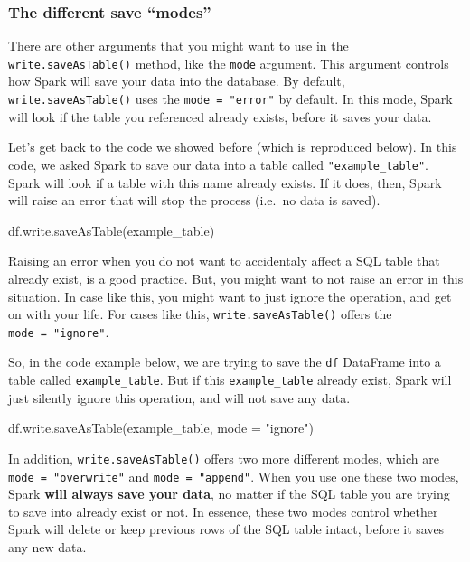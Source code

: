 \documentclass[
  11pt,
  letterpaper,
  DIV=11,
  numbers=noendperiod]{scrreprt}
\newenvironment{Shaded}{\begin{snugshade}}{\end{snugshade}}
\newcommand{\NormalTok}[1]{\textcolor[rgb]{0.00,0.23,0.31}{#1}}
\newcommand{\OperatorTok}[1]{\textcolor[rgb]{0.37,0.37,0.37}{#1}}
\newcommand{\StringTok}[1]{\textcolor[rgb]{0.13,0.47,0.30}{#1}}
\begin{document}
\subsubsection{The different save ``modes''}\label{sec-sql-save-modes}

There are other arguments that you might want to use in the
\texttt{write.saveAsTable()} method, like the \texttt{mode} argument.
This argument controls how Spark will save your data into the database.
By default, \texttt{write.saveAsTable()} uses the
\texttt{mode\ =\ "error"} by default. In this mode, Spark will look if
the table you referenced already exists, before it saves your data.

Let's get back to the code we showed before (which is reproduced below).
In this code, we asked Spark to save our data into a table called
\texttt{"example\_table"}. Spark will look if a table with this name
already exists. If it does, then, Spark will raise an error that will
stop the process (i.e.~no data is saved).

\begin{Shaded}
\begin{Highlighting}[]
\NormalTok{df.write.saveAsTable(}\StringTok{\textquotesingle{}example\_table\textquotesingle{}}\NormalTok{)}
\end{Highlighting}
\end{Shaded}

Raising an error when you do not want to accidentaly affect a SQL table
that already exist, is a good practice. But, you might want to not raise
an error in this situation. In case like this, you might want to just
ignore the operation, and get on with your life. For cases like this,
\texttt{write.saveAsTable()} offers the \texttt{mode\ =\ "ignore"}.

So, in the code example below, we are trying to save the \texttt{df}
DataFrame into a table called \texttt{example\_table}. But if this
\texttt{example\_table} already exist, Spark will just silently ignore
this operation, and will not save any data.

\begin{Shaded}
\begin{Highlighting}[]
\NormalTok{df.write.saveAsTable(}\StringTok{\textquotesingle{}example\_table\textquotesingle{}}\NormalTok{, mode }\OperatorTok{=} \StringTok{"ignore"}\NormalTok{)}
\end{Highlighting}
\end{Shaded}

In addition, \texttt{write.saveAsTable()} offers two more different
modes, which are \texttt{mode\ =\ "overwrite"} and
\texttt{mode\ =\ "append"}. When you use one these two modes, Spark
\textbf{will always save your data}, no matter if the SQL table you are
trying to save into already exist or not. In essence, these two modes
control whether Spark will delete or keep previous rows of the SQL table
intact, before it saves any new data.
\end{document}

